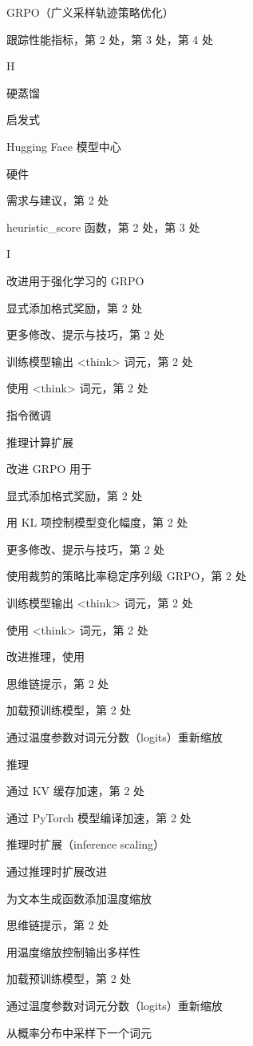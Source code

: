 GRPO（广义采样轨迹策略优化）

跟踪性能指标，第 2 处，第 3 处，第 4 处

H

硬蒸馏

启发式

Hugging Face 模型中心

硬件

需求与建议，第 2 处

heuristic\_score 函数，第 2 处，第 3 处

I

改进用于强化学习的 GRPO

显式添加格式奖励，第 2 处

更多修改、提示与技巧，第 2 处

训练模型输出 \textless{}think\textgreater{} 词元，第 2 处

使用 \textless{}think\textgreater{} 词元，第 2 处

指令微调

推理计算扩展

改进 GRPO 用于

显式添加格式奖励，第 2 处

用 KL 项控制模型变化幅度，第 2 处

更多修改、提示与技巧，第 2 处

使用裁剪的策略比率稳定序列级 GRPO，第 2 处

训练模型输出 \textless{}think\textgreater{} 词元，第 2 处

使用 \textless{}think\textgreater{} 词元，第 2 处

改进推理，使用

思维链提示，第 2 处

加载预训练模型，第 2 处

通过温度参数对词元分数（logits）重新缩放

推理

通过 KV 缓存加速，第 2 处

通过 PyTorch 模型编译加速，第 2 处

推理时扩展（inference scaling）

通过推理时扩展改进

为文本生成函数添加温度缩放

思维链提示，第 2 处

用温度缩放控制输出多样性

加载预训练模型，第 2 处

通过温度参数对词元分数（logits）重新缩放

从概率分布中采样下一个词元

